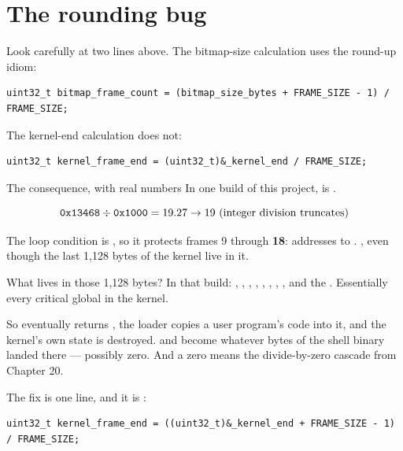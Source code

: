 \section{The rounding bug}

Look carefully at two lines above. The bitmap-size calculation uses the round-up idiom:

\begin{lstlisting}[style=c]
uint32_t bitmap_frame_count = (bitmap_size_bytes + FRAME_SIZE - 1) / FRAME_SIZE;
\end{lstlisting}

The kernel-end calculation does not:

\begin{lstlisting}[style=c]
uint32_t kernel_frame_end = (uint32_t)&_kernel_end / FRAME_SIZE;
\end{lstlisting}

\begin{danger}{The consequence, with real numbers}
In one build of this project,  is .

$$\texttt{0x13468} \div \texttt{0x1000} = 19.27 \rightarrow 19 \text{ (integer division truncates)}$$

The loop condition is , so it protects frames 9 through \textbf{18}: addresses
 to . ,
even though the last 1,128 bytes of the kernel live in it.

What lives in those 1,128 bytes? In that build: , , ,
, , , ,
,  and the . Essentially every critical global in
the kernel.

So  eventually returns , the loader copies a user program's code
into it, and the kernel's own state is destroyed.  and 
become whatever bytes of the shell binary landed there --- possibly zero. And a zero 
means the divide-by-zero cascade from Chapter 20.

The fix is one line, and it is :
\begin{lstlisting}[style=c]
uint32_t kernel_frame_end = ((uint32_t)&_kernel_end + FRAME_SIZE - 1) / FRAME_SIZE;
\end{lstlisting}
\end{danger}

